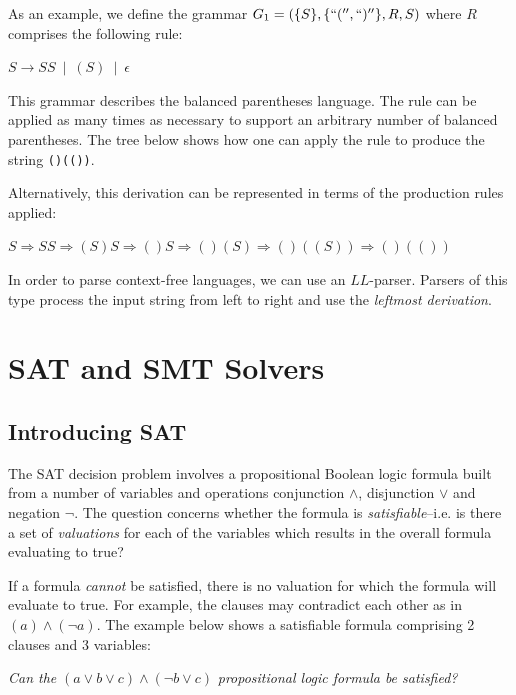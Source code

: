 \documentclass[a4paper,openany,12pt]{book}
\begin{document}
As an example, we define the grammar $G_1 = (\{S\}, \{``('', ``)''\}, R, S)$ where $R$ comprises the following rule:

\(
    S \to SS ~ \mid ~ (S) ~ \mid ~ \epsilon
\)

This grammar describes the balanced parentheses language.
The rule can be applied as many times as necessary to support an arbitrary number of balanced parentheses.
The tree below shows how one can apply the rule to produce the string \texttt{()(())}.


Alternatively, this derivation can be represented in terms of the production rules applied:

$S \Rightarrow SS \Rightarrow (S)S \Rightarrow ()S \Rightarrow ()(S) \Rightarrow ()((S)) \Rightarrow ()(())$

In order to parse context-free languages, we can use an $LL$-parser.
Parsers of this type process the input string from left to right and use the \emph{leftmost derivation}.


\section{SAT and SMT Solvers}

\subsection{Introducing SAT}

The SAT decision problem involves a propositional Boolean logic formula built from a number of variables and operations
conjunction $\land$, disjunction $\lor$ and negation $\neg$.
The question concerns whether the formula is \emph{satisfiable}--i.e. is there a set of \emph{valuations} for each of
the variables which results in the overall formula evaluating to true?

If a formula \emph{cannot} be satisfied, there is no valuation for which the formula will evaluate to true.
For example, the clauses may contradict each other as in $(a) \land (\neg a)$.
The example below shows a satisfiable formula comprising 2 clauses and 3 variables:

\emph{Can the} \(
    (a \lor b \lor c) \land (\neg b \lor c)
\) \emph{propositional logic formula be satisfied?}
\end{document}
